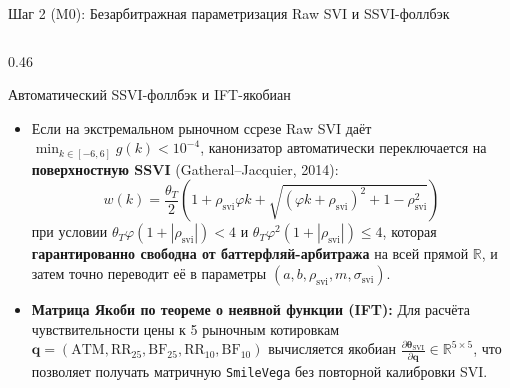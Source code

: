 \documentclass[aspectratio=169, 9pt]{beamer}
\begin{document}
\begin{frame}{Шаг 2 (M0): Безарбитражная параметризация Raw SVI и SSVI-фоллбэк}
\begin{columns}[T]
    \begin{column}{0.46\textwidth}
      \begin{exampleblock}{Автоматический SSVI-фоллбэк и IFT-якобиан}
        \begin{itemize}
          \item Если на экстремальном рыночном ссрезе Raw SVI даёт $\min_{k \in [-6,6]} g(k) < 10^{-4}$, канонизатор автоматически переключается на \textbf{поверхностную SSVI} (Gatheral--Jacquier, 2014):
            $$w(k) = \frac{\theta_T}{2}\!\left(1 + \rho_{\text{svi}}\varphi k + \sqrt{(\varphi k + \rho_{\text{svi}})^2 + 1 - \rho_{\text{svi}}^2}\right)$$
            при условии $\theta_T\varphi(1 + |\rho_{\text{svi}}|) < 4$ и $\theta_T\varphi^2(1 + |\rho_{\text{svi}}|) \le 4$, которая \textbf{гарантированно свободна от баттерфляй-арбитража} на всей прямой $\mathbb{R}$, и затем точно переводит её в параметры $(a,b,\rho_{\text{svi}},m,\sigma_{\text{svi}})$.
          \item \textbf{Матрица Якоби по теореме о неявной функции (IFT):}
            Для расчёта чувствительности цены к 5 рыночным котировкам $\bm{q} = (\text{ATM}, \text{RR}_{25}, \text{BF}_{25}, \text{RR}_{10}, \text{BF}_{10})$ вычисляется якобиан $\frac{\partial \bm{\theta}_{\text{SVI}}}{\partial \bm{q}} \in \mathbb{R}^{5\times 5}$, что позволяет получать матричную \texttt{SmileVega} без повторной калибровки SVI.
        \end{itemize}
      \end{exampleblock}
    \end{column}
  \end{columns}
\end{frame}
\end{document}
